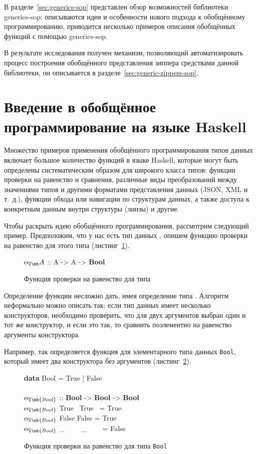 В разделе~\ref{sec:generics-sop} представлен обзор возможностей
библиотеки \textsf{generics-sop}: описываются идеи и особенности
нового подхода к обобщённому программированию, приводится
несколько примеров описания обобщённых функций с помощью
\textsf{generics-sop}.

В результате исследования получен механизм, позволяющий
автоматизировать процесс построения обобщённого представления
зиппера средствами данной библиотеки, он описывается в
разделе~\ref{sec:generic-zippers-sop}.

\section{Введение в обобщённое программирование на языке Haskell}
\label{sec:generic-prog}

Множество примеров применения обобщённого программирования
типов данных включает большое количество функций в языке Haskell,
которые могут быть определены систематическим образом для
широкого класса типов: функции проверки на равенство и сравнения,
различные виды преобразований между значениями типов и другими
форматами представления данных (JSON, XML и т.~д.), функции
обхода или навигации по структурам данных, а также доступа к
конкретным данным внутри структуры (линзы) и другие.

Чтобы раскрыть идею обобщённого программирования, рассмотрим
следующий пример. Предположим, что у нас есть тип данных
, опишем функцию проверки на равенство для этого типа
(листинг~\ref{list:eq-a}).
\begin{figure}[h]
\begin{framed}
\ttfamily\small
eq$_\mb A$ :: A -> A -> \textbf{Bool}
\end{framed}
\caption{Функция проверки на равенство для типа }
\label{list:eq-a}
\end{figure}

Определение функции  несложно дать, имея
определение типа . Алгоритм неформально можно описать
так: если тип данных имеет несколько конструкторов, необходимо
проверить, что для двух аргументов выбран один и тот же
конструктор, и если это так, то сравнить поэлементно на равенство
аргументы конструктора.

Например, так определяется функция  для
элементарного типа данных \lstinline{Bool}, который имеет два
конструктора без аргументов (листинг~\ref{list:eq-bool}).
\begin{figure}[h]
\begin{framed}
\ttfamily\small
\textbf{data} Bool = True | False\\
\\
eq$_\mb{Bool}$ :: \textbf{Bool} -> \textbf{Bool} -> \textbf{Bool}\\
eq$_\mb{Bool}$ True~ True~ = True\\
eq$_\mb{Bool}$ False False = True\\
eq$_\mb{Bool}$ \_~~~~ \_~~~~ = False
\end{framed}
\caption{Функция проверки на равенство для типа \lstinline{Bool}}
\label{list:eq-bool}
\end{figure}

